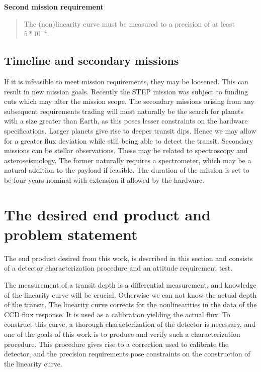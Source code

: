 \documentclass[../main.tex]{subfiles}
\begin{document}
	\begin{tcolorbox}[colframe = white, sharpish corners]
		\textbf{Second mission requirement}
		\begin{quote}
			The (non)linearity curve must be measured to a precision of at least $5*10^{-4}$.
		\end{quote}
	\end{tcolorbox}
	
	\subsection{Timeline and secondary missions}
	If it is infeasible to meet mission requirements, they may be loosened. This can result in new mission goals. Recently the STEP mission was subject to funding cuts which may alter the mission scope. The secondary missions arising from any subsequent requirements trading will most naturally be the search for planets with a size greater than Earth, as this poses lesser constraints on the hardware specifications. Larger planets give rise to deeper transit dips. Hence we may allow for a greater flux deviation while still being able to detect the transit. 
	Secondary missions can be stellar observations. These may be related to spectroscopy and asteroseismology. The former naturally requires a spectrometer, which may be a natural addition to the payload if feasible. The duration of the mission is set to be four years nominal with extension if allowed by the hardware. 
	
	\section{The desired end product and problem statement} 
	The end product desired from this work, is described in this section and consists of a detector characterization procedure and an attitude requirement test.
	
	The measurement of a transit depth is a differential measurement, and knowledge of the linearity curve will be crucial. Otherwise we can not know the actual depth of the transit. The linearity curve corrects for the nonlinearities in the data of the CCD flux response. It is used as a calibration yielding the actual flux. To construct this curve, a thorough characterization of the detector is necessary, and one of the goals of this work is to produce and verify such a characterization procedure. This procedure gives rise to a correction used to calibrate the detector, and the precision requirements pose constraints on the construction of the linearity curve.
	
\end{document}
